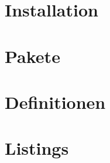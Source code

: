 \documentclass[a4paper,12pt]{report}
\title{\fontspec{Times New Roman}\common}
\author{\fontspec{Times New Roman}ɛntiˈtɛːt.kaɪ̯}
\date{%
			{\fontspec{Times New Roman}19. März 2016} \\
			{\bf---} \\[0.2\baselineskip]
			\fontspec{Times New Roman}\today}
\begin{document}
		\listoftodos

		


		\maketitle



		

		\tableofcontents    %
		\listoffigures      %
		\listoftables       %
		\lstlistoflistings  %



		\chapter{Installation}
		\chapter{Pakete}
		\chapter{Definitionen}


		\printbibliography

		\printindex


		\appendix
		\chapter{Listings}


		
\end{document}
